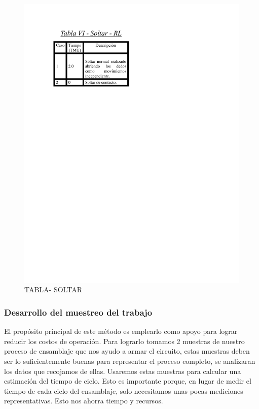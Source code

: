     \begin{figure}
        \centering
        \includegraphics[trim = {0mm 0mm 0mm 13mm},clip,scale=0.3]{24/Img/tablaSoltar.pdf}
        \caption{TABLA- SOLTAR}
        \label{fig:SOLTAR}
    \end{figure}
    \subsubsection{Desarrollo del muestreo del trabajo}
    El propósito principal de este método es emplearlo como apoyo para lograr reducir los costos de operación. Para lograrlo tomamos 2 muestras de nuestro proceso de ensamblaje que nos ayudo a armar el circuito, estas muestras deben ser lo suficientemente buenas para representar el proceso completo, se analizaran los datos que recojamos de ellas. Usaremos estas muestras para calcular una estimación del tiempo de ciclo. Esto es importante porque, en lugar de medir el tiempo de cada ciclo del ensamblaje, solo necesitamos unas pocas mediciones representativas. Esto nos ahorra tiempo y recursos.
    
